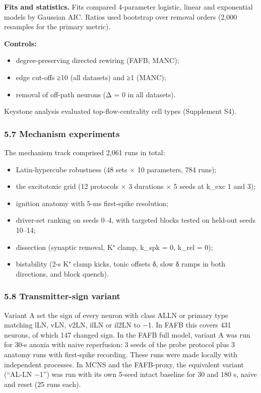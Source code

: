 \documentclass[11pt]{article}
\providecommand{\tightlist}{\setlength{\itemsep}{0pt}\setlength{\parskip}{0pt}}
\begin{document}
\textbf{Fits and statistics.} Fits compared 4-parameter logistic, linear and exponential models by Gaussian AIC. Ratios used bootstrap over removal orders (2,000 resamples for the primary metric).

\textbf{Controls:}

\begin{itemize}
\tightlist
\item
  degree-preserving directed rewiring (FAFB, MANC);
\item
  edge cut-offs ≥10 (all datasets) and ≥1 (MANC);
\item
  removal of off-path neurons (Δ = 0 in all datasets).
\end{itemize}

Keystone analysis evaluated top-flow-centrality cell types (Supplement S4).

\subsubsection{5.7 Mechanism experiments}\label{mechanism-experiments}

The mechanism track comprised 2,061 runs in total:

\begin{itemize}
\tightlist
\item
  Latin-hypercube robustness (48 sets × 10 parameters, 784 runs);
\item
  the excitotoxic grid (12 protocols × 3 durations × 5 seeds at k\_exc 1 and 3);
\item
  ignition anatomy with 5-ms first-spike resolution;
\item
  driver-set ranking on seeds 0--4, with targeted blocks tested on held-out seeds 10--14;
\item
  dissection (synaptic removal, K⁺ clamp, k\_spk = 0, k\_rel = 0);
\item
  bistability (2-s K⁺ clamp kicks, tonic offsets δ, slow δ ramps in both directions, and block quench).
\end{itemize}

\subsubsection{5.8 Transmitter-sign variant}\label{transmitter-sign-variant}

Variant A set the sign of every neuron with class ALLN or primary type matching lLN, vLN, v2LN, ilLN or il2LN to −1. In FAFB this covers 431 neurons, of which 147 changed sign. In the FAFB full model, variant A was run for 30-s anoxia with naive reperfusion: 3 seeds of the probe protocol plus 3 anatomy runs with first-spike recording. These runs were made locally with independent processes. In MCNS and the FAFB-proxy, the equivalent variant (``AL-LN −1'') was run with its own 5-seed intact baseline for 30 and 180 s, naive and reset (25 runs each).
\end{document}
